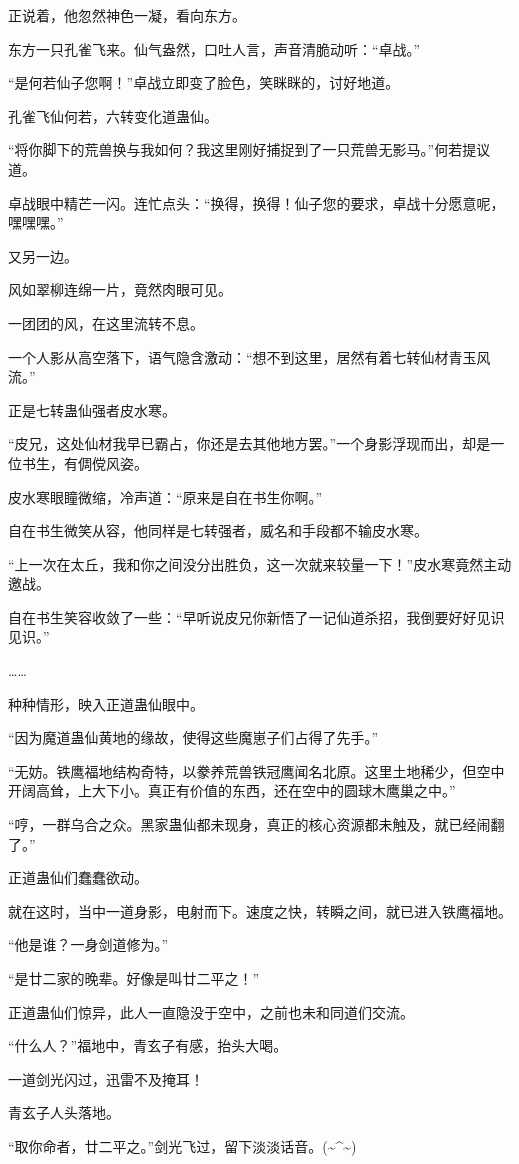 \begin{this_body}
正说着，他忽然神色一凝，看向东方。

东方一只孔雀飞来。仙气盎然，口吐人言，声音清脆动听：“卓战。”

“是何若仙子您啊！”卓战立即变了脸色，笑眯眯的，讨好地道。

孔雀飞仙何若，六转变化道蛊仙。

“将你脚下的荒兽换与我如何？我这里刚好捕捉到了一只荒兽无影马。”何若提议道。

卓战眼中精芒一闪。连忙点头：“换得，换得！仙子您的要求，卓战十分愿意呢，嘿嘿嘿。”

又另一边。

风如翠柳连绵一片，竟然肉眼可见。

一团团的风，在这里流转不息。

一个人影从高空落下，语气隐含激动：“想不到这里，居然有着七转仙材青玉风流。”

正是七转蛊仙强者皮水寒。

“皮兄，这处仙材我早已霸占，你还是去其他地方罢。”一个身影浮现而出，却是一位书生，有倜傥风姿。

皮水寒眼瞳微缩，冷声道：“原来是自在书生你啊。”

自在书生微笑从容，他同样是七转强者，威名和手段都不输皮水寒。

“上一次在太丘，我和你之间没分出胜负，这一次就来较量一下！”皮水寒竟然主动邀战。

自在书生笑容收敛了一些：“早听说皮兄你新悟了一记仙道杀招，我倒要好好见识见识。”

……

种种情形，映入正道蛊仙眼中。

“因为魔道蛊仙黄地的缘故，使得这些魔崽子们占得了先手。”

“无妨。铁鹰福地结构奇特，以豢养荒兽铁冠鹰闻名北原。这里土地稀少，但空中开阔高耸，上大下小。真正有价值的东西，还在空中的圆球木鹰巢之中。”

“哼，一群乌合之众。黑家蛊仙都未现身，真正的核心资源都未触及，就已经闹翻了。”

正道蛊仙们蠢蠢欲动。

就在这时，当中一道身影，电射而下。速度之快，转瞬之间，就已进入铁鹰福地。

“他是谁？一身剑道修为。”

“是廿二家的晚辈。好像是叫廿二平之！”

正道蛊仙们惊异，此人一直隐没于空中，之前也未和同道们交流。

“什么人？”福地中，青玄子有感，抬头大喝。

一道剑光闪过，迅雷不及掩耳！

青玄子人头落地。

“取你命者，廿二平之。”剑光飞过，留下淡淡话音。(\~{}\^{}\~{})

\end{this_body}

